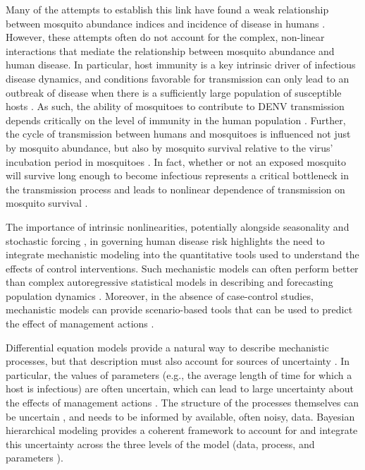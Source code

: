 \documentclass[10pt,letterpaper]{article}
\begin{document}
Many of the attempts to establish this link have found a weak relationship between mosquito abundance indices and incidence of disease in humans \cite{Bowman2014, Pepin2015, Cromwell2017}.
However, these attempts often do not account for the complex, non-linear interactions that mediate the relationship between mosquito abundance and human disease.
In particular, host immunity is a key intrinsic driver of infectious disease dynamics, and conditions favorable for transmission can only lead to an outbreak of disease when there is a sufficiently large population of susceptible hosts \cite{Koelle2004, Koelle2005}.
As such, the ability of mosquitoes to contribute to DENV transmission depends critically on the level of immunity in the human population \cite{Scott2010a}.
Further, the cycle of transmission between humans and mosquitoes is influenced not just by mosquito abundance, but also by mosquito survival relative to the virus' incubation period in mosquitoes \cite{Smith2012}.
In fact, whether or not an exposed mosquito will survive long enough to become infectious represents a critical bottleneck in the transmission process and leads to nonlinear dependence of transmission on mosquito survival \cite{Smith2012}.

The importance of intrinsic nonlinearities, potentially alongside seasonality and stochastic forcing \cite{Ellner1998, Koelle2004, Grenfell2002}, in governing human disease risk highlights the need to integrate mechanistic modeling into the quantitative tools used to understand the effects of control interventions.
Such mechanistic models can often perform better than complex autoregressive statistical models in describing and forecasting population dynamics \cite{Reilly2005}.
Moreover, in the absence of case-control studies, mechanistic models can provide scenario-based tools that can be used to predict the effect of management actions \cite{Buckland2007}.

Differential equation models provide a natural way to describe mechanistic processes, but that description must also account for sources of uncertainty \cite{Hotelling1927, Wikle2010}.
In particular, the values of parameters (e.g., the average length of time for which a host is infectious) are often uncertain, which can lead to large uncertainty about the effects of management actions \cite{Elderd2006}.
The structure of the processes themselves can be uncertain \cite{Ellner1998}, and needs to be informed by available, often noisy, data.
Bayesian hierarchical modeling provides a coherent framework to account for and integrate this uncertainty across the three levels of the model (data, process, and parameters \cite{Berliner1996, Cressie2009}).
\end{document}
